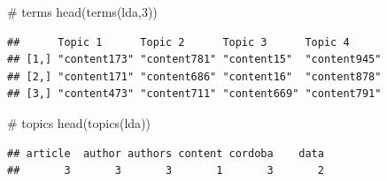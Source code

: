 \documentclass[
]{article}
\newenvironment{Shaded}{}{}
\newcommand{\CommentTok}[1]{\textcolor[rgb]{0.30,0.53,0.42}{#1}}
\newcommand{\DecValTok}[1]{\textcolor[rgb]{0.00,0.00,0.80}{#1}}
\newcommand{\FunctionTok}[1]{#1}
\newcommand{\NormalTok}[1]{#1}
\begin{document}
\begin{Shaded}
\begin{Highlighting}[]
\CommentTok{\# terms}
\FunctionTok{head}\NormalTok{(}\FunctionTok{terms}\NormalTok{(lda,}\DecValTok{3}\NormalTok{))}
\end{Highlighting}
\end{Shaded}

\begin{verbatim}
##      Topic 1      Topic 2      Topic 3      Topic 4     
## [1,] "content173" "content781" "content15"  "content945"
## [2,] "content171" "content686" "content16"  "content878"
## [3,] "content473" "content711" "content669" "content791"
\end{verbatim}

\begin{Shaded}
\begin{Highlighting}[]
\CommentTok{\# topics}
\FunctionTok{head}\NormalTok{(}\FunctionTok{topics}\NormalTok{(lda))}
\end{Highlighting}
\end{Shaded}

\begin{verbatim}
## article  author authors content cordoba    data 
##       3       3       3       1       3       2
\end{verbatim}
\end{document}
